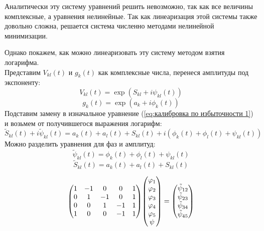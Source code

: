 Аналитически эту систему уравнений решить невозможно, так как все величины комплексные, а уравнения нелинейные. Так как линеаризация этой системы также довольно сложна, решается система численно методами нелинейной минимизации.

Однако покажем, как можно линеаризовать эту систему методом взятия логарифма. \\
Представим ${V}_{kl}(t)$ и ${g}_{k}(t)$ как комплексные числа, перенеся амплитуды под экспоненту:
\begin{equation}\label{eq:замена видности}
	{V}_{kl}(t) = \exp({S}_{kl} + i\psi_{kl}(t))
\end{equation}
\begin{equation}\label{eq:замена коэф передачи}
	{g}_{k}(t) = \exp({a}_{k} + i\phi_{k}(t))
\end{equation}
Подставим замену в изначальное уравнение (\ref{eq:калибровка по избыточности 1}) и возьмем от получившегося выражения логарифм:
\begin{equation}\label{eq:подстановка в 1.2}
	\tilde{S}_{kl}(t) + i\tilde{\psi}_{kl}(t) = {a}_{k}(t) + {a}_{l}(t) + {S}_{kl}(t) + i (\phi_{k}(t) + \phi_{l}(t) + {\psi}_{kl}(t))
\end{equation}
Можно разделить уравнения для фаз и амплитуд:
\begin{equation}\label{eq:разделение для амплитуд}
	\tilde{\psi}_{kl}(t) = \phi_{k}(t) + \phi_{l}(t) + {\psi}_{kl}(t)
\end{equation}
\begin{equation}\label{eq:разделение для фаз}
	\tilde{S}_{kl}(t) = {a}_{k}(t) + {a}_{l}(t) + {S}_{kl}(t)
\end{equation}

\begin{equation}
	\mqty( %
	1&-1&0&0&1\\	0&1&-1&0&1\\	0&0&1&-1&1\\	1&0&0&-1&1
	)
	\mqty(
	\phi_{1}\\	\phi_{2}\\	\phi_{3}\\	\phi_{4}\\	\phi_{5}\\	\psi
	)=
	\mqty(
	\tilde{\psi}_{12}\\	\tilde{\psi}_{23}\\	\tilde{\psi}_{34}\\	\tilde{\psi}_{45}
	)
\end{equation}

